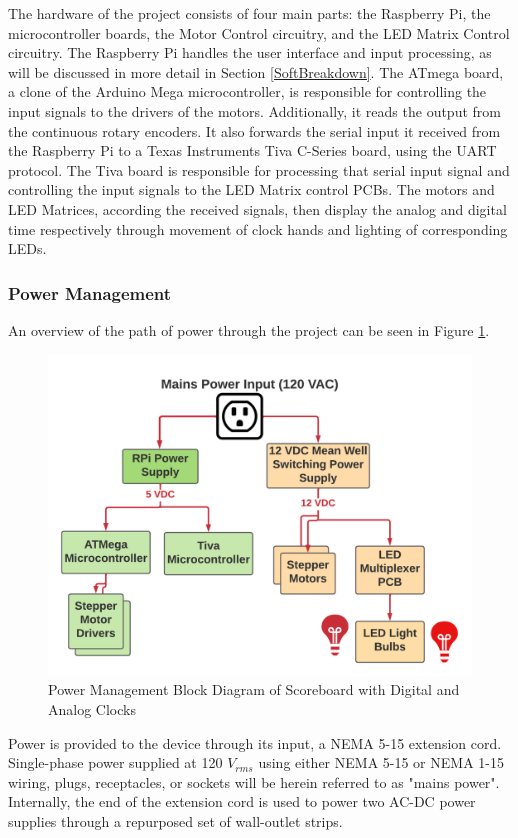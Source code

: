 \documentclass[11pt]{article}
\begin{document}
The hardware of the project consists of four main parts: the Raspberry Pi, the microcontroller boards, the Motor Control circuitry, and the LED Matrix Control circuitry. 
The Raspberry Pi handles the user interface and input processing, as will be discussed in more detail in Section \ref{SoftBreakdown}. 
The ATmega board, a clone of the Arduino Mega microcontroller, is responsible for controlling the input signals to the drivers of the motors.
Additionally, it reads the output from the continuous rotary encoders. 
It also forwards the serial input it received from the Raspberry Pi to a Texas Instruments Tiva C-Series board, using the UART protocol. 
The Tiva board is responsible for processing that serial input signal and controlling the input signals to the LED Matrix control PCBs. 
The motors and LED Matrices, according the received signals, then display the analog and digital time respectively through movement of clock hands and lighting of corresponding LEDs.  


\subsubsection{Power Management}


\label{PowerBreakdown}

An overview of the path of power through the project can be seen in Figure \ref{PowerBlock}. 

\begin{figure}[H]
\centering
\includegraphics[width=4.5in]{Power_Diagram.png}
\caption{Power Management Block Diagram of Scoreboard with Digital and Analog Clocks }
\label{PowerBlock}
\end{figure}
Power is provided to the device through its input, a NEMA 5-15 extension cord. 
Single-phase power supplied at 120 $V_{rms}$ using either NEMA 5-15 or NEMA 1-15 wiring, plugs, receptacles, or sockets will be herein referred to as "mains power".
Internally, the end of the extension cord is used to power two  AC-DC power supplies through a repurposed set of wall-outlet strips. 
\end{document}
